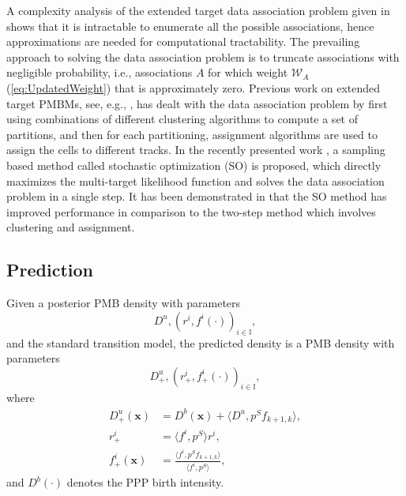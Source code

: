 \documentclass[journal]{IEEEtran}
\begin{document}
A complexity analysis of the extended target data association problem given in \cite{pmbmextended2} shows that it is intractable to enumerate all the possible associations, hence approximations are needed for computational tractability. The prevailing approach to solving the data association problem is to truncate associations with negligible probability, i.e., associations $A$ for which weight $\mathcal{W}_A$ (\ref{eq:UpdatedWeight}) that is approximately zero. Previous work on extended target PMBMs, see, e.g., \cite{pmbmextended,pmbmextended2}, has dealt with the data association problem by first using combinations of different clustering algorithms to compute a set of partitions, and then for each partitioning, assignment algorithms are used to assign the cells to different tracks. In the recently presented work \cite{soextended}, a sampling based method called stochastic optimization (SO) is proposed, which directly maximizes the multi-target likelihood function and solves the data association problem in a single step. It has been demonstrated in \cite{soextended} that the SO method has improved performance in comparison to the two-step method which involves clustering and assignment.


\subsection{Prediction}

Given a posterior PMB density with parameters 
\begin{equation}
D^u, {(r^i ,f^i(\cdot) )}_{i\in\mathbb{I}},
\end{equation}
and the standard transition model, the predicted density is a PMB density with parameters \cite{pmbmpoint}
\begin{equation}
D^u_+, {(r_+^i ,f_+^i(\cdot) )}_{i\in\mathbb{I}},
\label{eq:prediction}
\end{equation}
where 
\begin{subequations}
\begin{align}
    D^u_+(\mathbf{x}) &= D^b(\mathbf{x})+\langle D^u,p^Sf_{k+1,k}\rangle,\\
    r^i_+ &= \langle f^i,p^S\rangle r^i,\\
    f_+^i(\mathbf{x}) &= \frac{\langle f^i,p^Sf_{k+1,k}\rangle}{\langle f^i,p^S\rangle},
\end{align}
\end{subequations}
and $D^b(\cdot)$ denotes the PPP birth intensity.
\end{document}
